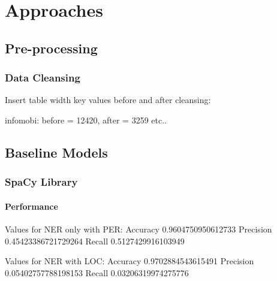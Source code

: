 \chapter{Approaches}

\section{Pre-processing}

\subsection{Data Cleansing}

Insert table width key values before and after cleansing:

infomobi: before = 12420, after = 3259
etc..

\section{Baseline Models}

\subsection{SpaCy Library}

\subsubsection{Performance}

Values for NER only with PER:
    Accuracy 0.9604750950612733
    Precision 0.45423386721729264
    Recall 0.5127429916103949
    
Values for NER with LOC:
	Accuracy 0.9702884543615491
	Precision 0.05402757788198153
	Recall 0.03206319974275776



